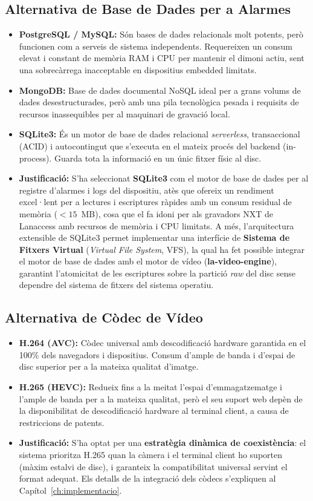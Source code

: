 \subsection{Alternativa de Base de Dades per a Alarmes}
\begin{itemize}
  \item \textbf{PostgreSQL / MySQL:} Són bases de dades relacionals molt potents, però funcionen com a serveis de sistema independents. Requereixen un consum elevat i constant de memòria RAM i CPU per mantenir el dimoni actiu, sent una sobrecàrrega inacceptable en dispositius embedded limitats.
  \item \textbf{MongoDB:} Base de dades documental NoSQL ideal per a grans volums de dades desestructurades, però amb una pila tecnològica pesada i requisits de recursos inassequibles per al maquinari de gravació local.
  \item \textbf{SQLite3:} És un motor de base de dades relacional \textit{serverless}, transaccional (ACID) i autocontingut que s'executa en el mateix procés del backend (in-process). Guarda tota la informació en un únic fitxer físic al disc.
  \item \textbf{Justificació:} S'ha seleccionat \textbf{SQLite3} com el motor de base de dades per al registre d'alarmes i logs del dispositiu, atès que ofereix un rendiment excel·lent per a lectures i escriptures ràpides amb un consum residual de memòria ($<15$~MB), cosa que el fa idoni per als gravadors NXT de Lanaccess amb recursos de memòria i CPU limitats. A més, l'arquitectura extensible de SQLite3 permet implementar una interfície de \textbf{Sistema de Fitxers Virtual} (\textit{Virtual File System}, VFS), la qual ha fet possible integrar el motor de base de dades amb el motor de vídeo (\textbf{la-video-engine}), garantint l'atomicitat de les escriptures sobre la partició \textit{raw} del disc sense dependre del sistema de fitxers del sistema operatiu.
\end{itemize}

\subsection{Alternativa de Còdec de Vídeo}
\begin{itemize}
  \item \textbf{H.264 (AVC):} Còdec universal amb descodificació hardware garantida en el 100\% dels navegadors i dispositius. Consum d'ample de banda i d'espai de disc superior per a la mateixa qualitat d'imatge.
  \item \textbf{H.265 (HEVC):} Redueix fins a la meitat l'espai d'emmagatzematge i l'ample de banda per a la mateixa qualitat, però el seu suport web depèn de la disponibilitat de descodificació hardware al terminal client, a causa de restriccions de patents.
  \item \textbf{Justificació:} S'ha optat per una \textbf{estratègia dinàmica de coexistència}: el sistema prioritza H.265 quan la càmera i el terminal client ho suporten (màxim estalvi de disc), i garanteix la compatibilitat universal servint el format adequat. Els detalls de la integració dels còdecs s'expliquen al Capítol~\ref{ch:implementacio}.
\end{itemize}

